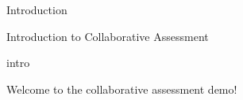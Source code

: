 
\begin{edXchapter}{Introduction}

\begin{edXsection}{Introduction to Collaborative Assessment}

\begin{edXvertical}

\begin{edXtext}{intro}

Welcome to the collaborative assessment demo!


\end{edXtext}

\end{edXvertical}

\end{edXsection}

\end{edXchapter}

